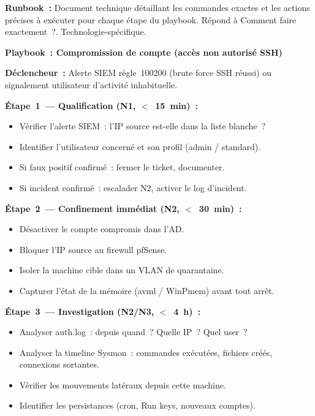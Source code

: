 \begin{boxdef}
\textbf{Runbook~:} Document technique détaillant les commandes exactes
et les actions précises à exécuter pour chaque étape du playbook.
Répond à \og{}Comment faire exactement~?\fg{}. Technologie-spécifique.
\end{boxdef}

\begin{boxplaybook}
\textbf{Playbook~: Compromission de compte (accès non autorisé SSH)}

\textbf{Déclencheur~:} Alerte SIEM règle~100200 (brute force SSH réussi)
ou signalement utilisateur d'activité inhabituelle.

\textbf{Étape~1~--- Qualification (N1, $<$~15~min)~:}
\begin{itemize}
  \item Vérifier l'alerte SIEM~: l'IP source est-elle dans la liste blanche~?
  \item Identifier l'utilisateur concerné et son profil (admin / standard).
  \item Si faux positif confirmé~: fermer le ticket, documenter.
  \item Si incident confirmé~: escalader N2, activer le log d'incident.
\end{itemize}

\textbf{Étape~2~--- Confinement immédiat (N2, $<$~30~min)~:}
\begin{itemize}
  \item Désactiver le compte compromis dans l'AD.
  \item Bloquer l'IP source au firewall pfSense.
  \item Isoler la machine cible dans un VLAN de quarantaine.
  \item Capturer l'état de la mémoire (avml / WinPmem) avant tout arrêt.
\end{itemize}

\textbf{Étape~3~--- Investigation (N2/N3, $<$~4~h)~:}
\begin{itemize}
  \item Analyser auth.log~: depuis quand~? Quelle IP~? Quel user~?
  \item Analyser la timeline Sysmon~: commandes exécutées, fichiers créés,
        connexions sortantes.
  \item Vérifier les mouvements latéraux depuis cette machine.
  \item Identifier les persistances (cron, Run keys, nouveaux comptes).
\end{itemize}


\end{boxplaybook}

